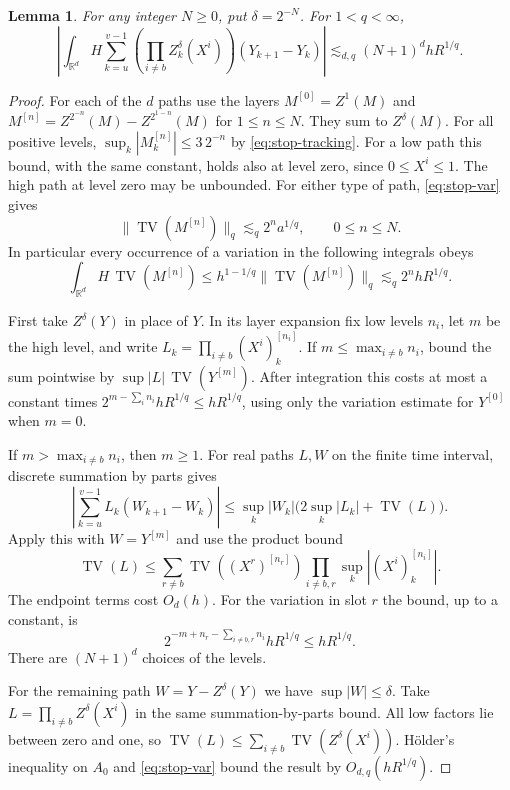 \documentclass[11pt]{article}
\newtheorem{lemma}[theorem]{Lemma}
\newcommand{\R}{\mathbb R}
\newcommand{\anorm}[1]{\lVert #1\rVert}
\begin{document}
\begin{lemma}\label{lem:all-coarse}
For any integer \(N\ge0\), put \(\delta=2^{-N}\). For \(1<q<\infty\),
\[
 \left|\int_{\R^d}H\sum_{k=u}^{v-1}
       \left(\prod_{i\ne b} Z^\delta_k(X^i)\right)(Y_{k+1}-Y_k)\right|
 \lesssim_{d,q} (N+1)^d h R^{1/q}.
\]
\end{lemma}
\begin{proof}
For each of the \(d\) paths use the layers \(M^{[0]}=Z^1(M)\) and
\(M^{[n]}=Z^{2^{-n}}(M)-Z^{2^{1-n}}(M)\) for \(1\le n\le N\).
They sum to \(Z^\delta(M)\). For all positive levels,
\(\sup_k|M_k^{[n]}|\le3\,2^{-n}\) by \eqref{eq:stop-tracking}.
For a low path this bound, with the same constant, holds also at
level zero, since \(0\le X^i\le1\). The high path at level zero
may be unbounded. For either type of path, \eqref{eq:stop-var} gives
\begin{equation}\label{eq:stop-layer}
    \anorm{\operatorname{TV}(M^{[n]})}_q\lesssim_q 2^n a^{1/q},
    \qquad 0\le n\le N.
\end{equation}
In particular every occurrence of a variation in the following
integrals obeys
\[
 \int_{\R^d} H\,\operatorname{TV}(M^{[n]})
 \le h^{1-1/q}\anorm{\operatorname{TV}(M^{[n]})}_q
 \lesssim_q 2^n h R^{1/q}.
\]

First take \(Z^\delta(Y)\) in place of \(Y\). In its layer expansion
fix low levels \(n_i\), let \(m\) be the high level, and write
\(L_k=\prod_{i\ne b}(X^i)^{[n_i]}_k\). If \(m\le\max_{i\ne b}n_i\),
bound the sum pointwise by \(\sup|L|\,\operatorname{TV}(Y^{[m]})\).
After integration this costs at most a constant times
\(2^{m-\sum_i n_i}hR^{1/q}\le hR^{1/q}\), using only the variation
estimate for \(Y^{[0]}\) when \(m=0\).

If \(m>\max_{i\ne b}n_i\), then \(m\ge1\). For real paths \(L,W\)
on the finite time interval, discrete summation by parts gives
\[
 \left|\sum_{k=u}^{v-1}L_k(W_{k+1}-W_k)\right|
 \le \sup_k|W_k|\bigl(2\sup_k|L_k|+\operatorname{TV}(L)\bigr).
\]
Apply this with \(W=Y^{[m]}\) and use the product bound
\[
\operatorname{TV}(L)\le
\sum_{r\ne b}\operatorname{TV}((X^r)^{[n_r]})
\prod_{i\ne b,r}\sup_k|(X^i)_k^{[n_i]}| .
\]
The endpoint terms cost \(O_d(h)\). For the variation in slot \(r\) the
bound, up to a constant, is
\[
             2^{-m+n_r-\sum_{i\ne b,r}n_i}hR^{1/q}\le hR^{1/q}.
\]
There are \((N+1)^d\) choices of the levels.

For the remaining path \(W=Y-Z^\delta(Y)\) we have \(\sup|W|\le\delta\).
Take \(L=\prod_{i\ne b}Z^\delta(X^i)\) in the same summation-by-parts
bound. All low factors lie between zero and one, so
\(\operatorname{TV}(L)\le\sum_{i\ne b}\operatorname{TV}(Z^\delta(X^i))\).
H\"older's inequality on \(A_0\) and \eqref{eq:stop-var} bound the
result by \(O_{d,q}(hR^{1/q})\).
\end{proof}
\end{document}
